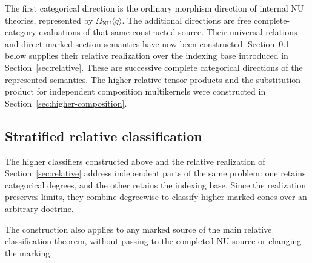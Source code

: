 \documentclass[oneside]{article}
\theoremstyle{plain}
\theoremstyle{definition}
\theoremstyle{remark}
\newcommand{\NU}{\mathrm{NU}}
\begin{document}
The first categorical direction is the ordinary morphism direction of
internal NU theories, represented by
$\Omega_{\NU}\langle q\rangle$.  The additional directions are free
complete-category evaluations of that same constructed source.  Their universal relations and direct marked-section semantics have now
been constructed. Section~\ref{subsec:stratified-relative} below
supplies their relative realization over the indexing base introduced
in Section~\ref{sec:relative}. These are successive complete
categorical directions of the represented semantics. The higher
relative tensor products and the substitution product for independent
composition multikernels were constructed in
Section~\ref{sec:higher-composition}.

\subsection{Stratified relative classification}
\label{subsec:stratified-relative}

The higher classifiers constructed above and the relative realization
of Section~\ref{sec:relative} address independent parts of the same
problem: one retains categorical degrees, and the other retains the
indexing base. Since the realization preserves limits, they combine
degreewise to classify higher marked cones over an arbitrary doctrine.

The construction also applies to any marked source of the main
relative classification theorem, without passing to the completed
NU source or changing the marking.
\end{document}
